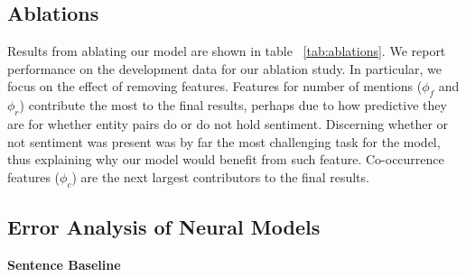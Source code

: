 \documentclass[11pt,a4paper]{article}
\begin{document}

\subsection{Ablations}
Results from ablating our model are shown in table ~\ref{tab:ablations}.
We report performance on the development data for our ablation study.
In particular, we focus on the effect of removing features.
Features for number of mentions ($\phi_f$ and $\phi_r$) contribute the most to the final results, perhaps due to how predictive they are for whether entity pairs do or do not hold sentiment.
Discerning whether or not sentiment was present was by far the most challenging task for the model, thus explaining why our model would benefit from such feature.
Co-occurrence features ($\phi_c$) are the next largest contributors to the final results.

\subsection{Error Analysis of Neural Models}
\noindent\textbf{Sentence Baseline}
\end{document}
